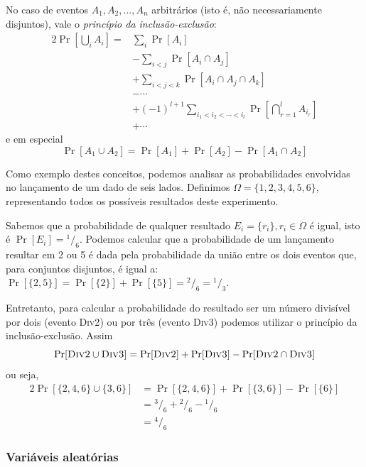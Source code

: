 No caso de eventos $A_1, A_2, ..., A_n$ arbitrários (isto é, não necessariamente disjuntos), vale o \emph{princípio da inclusão-exclusão}:
\begin{alignat*}{2}
    \Pr\left[ \bigcup_i A_i \right] = & \sum_i \Pr[A_i] \\
                                  & - \sum_{i<j} \Pr[A_i \cap A_j] \\
                                  & + \sum_{i<j<k} \Pr[A_i \cap A_j \cap A_k] \\
                                  & - \cdots \\
                                  & + (-1)^{l+1} \sum_{i_1 < i_2 < \cdots < i_l} \Pr \left[ \bigcap_{r=1}^{l} A_{i_r} \right] \\
                                  & + \cdots
\end{alignat*}
e em especial
\[
    \Pr[A_1 \cup A_2] = \Pr[A_1] + \Pr[A_2] - \Pr[A_1 \cap A_2]
\]

Como exemplo destes conceitos, podemos analisar as probabilidades envolvidas no lançamento de um dado de seis lados. Definimos $\Omega = \{1, 2, 3, 4, 5, 6\}$, representando todos os possíveis resultados deste experimento. 

Sabemos que a probabilidade de qualquer resultado $E_i = \{r_i\}, r_i \in \Omega$ é igual, isto é $\Pr[E_i] = {^{1}/_{6}}$. Podemos calcular que a probabilidade de um lançamento resultar em 2 ou 5 é dada pela probabilidade da união entre os dois eventos que, para conjuntos disjuntos, é igual a: $\Pr[\{2, 5\}] = \Pr[\{2\}] + \Pr[\{5\}] = {^2/_6} = {^1/_3}$.

Entretanto, para calcular a probabilidade do resultado ser um número divisível por dois (evento \textsc{Div2}) ou por três (evento \textsc{Div3}) podemos utilizar o princípio da inclusão-exclusão. Assim 
\[
\Pr[\textsc{Div2} \cup \textsc{Div3}] = \Pr[\textsc{Div2}] + \Pr[\textsc{Div3}] - \Pr[\textsc{Div2} \cap \textsc{Div3}]
\]
ou seja,
\begin{alignat*}{2}
\Pr[\{2,4,6\} \cup \{3,6\}] &= \Pr[\{2,4,6\}] + \Pr[\{3,6\}] - \Pr[\{6\}] \\
                            &= {^3/_6} + {^2/_6} - {^1/_6} \\
                            &= {^4/_6}
\end{alignat*}

\subsubsection{Variáveis aleatórias}

